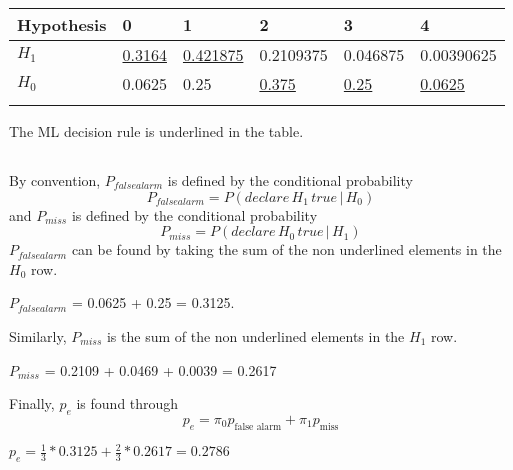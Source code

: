 \documentclass{exam}
\begin{document}
\begin{table}[h!]
\centering
\begin{tabular}{llllll}
\hline
\multicolumn{1}{|l|}{Hypothesis} & \multicolumn{1}{l|}{0} & \multicolumn{1}{l|}{1} & \multicolumn{1}{l|}{2} & \multicolumn{1}{l|}{3} & \multicolumn{1}{l|}{4} \\ \hline
\multicolumn{1}{|l|}{$H_{1}$}         & \multicolumn{1}{l|}{\underline{0.3164}}  & \multicolumn{1}{l|}{\underline{0.421875}}  & \multicolumn{1}{l|}{0.2109375}  & \multicolumn{1}{l|}{0.046875}  & \multicolumn{1}{l|}{0.00390625}  \\ \hline
\multicolumn{1}{|l|}{$H_{0}$}         & \multicolumn{1}{l|}{0.0625}  & \multicolumn{1}{l|}{0.25}  & \multicolumn{1}{l|}{\underline{0.375}}  & \multicolumn{1}{l|}{\underline{0.25}}  & \multicolumn{1}{l|}{\underline{0.0625}}  \\ \hline
                                 &                        &                        &                        &                        &                       
\end{tabular}
\end{table}

The ML decision rule is underlined in the table. 

\subsection{}

By convention, $P_{false alarm}$ is defined by the conditional probability 
\begin{equation}
    P_{false alarm} = P(declare\, H_{1}\, true\, |\, H_{0} )
\end{equation}
and $P_{miss}$ is defined by the conditional probability 
\begin{equation}
    P_{miss} = P(declare\, H_{0}\, true\, |\, H_{1} )
\end{equation}
$P_{false alarm}$ can be found by taking the sum of the non underlined elements in the $H_0$ row.
\begin{center}
$P_{false alarm}$ = 0.0625 + 0.25 = 0.3125.
\end{center}
Similarly, $P_{miss}$ is the sum of the non underlined elements in the $H_1$ row.
\begin{center}
$P_{miss}$ = 0.2109 + 0.0469 + 0.0039 = 0.2617
\end{center}
Finally, \( p_e \) is found through
\[
p_e = \pi_{0} p_{\text{false alarm}} + \pi_{1} p_{\text{miss}}
\]
\begin{center}
$p_e = \frac{1}{3}*0.3125 + \frac{2}{3}*0.2617 = 0.2786$
\end{center}
\end{document}
